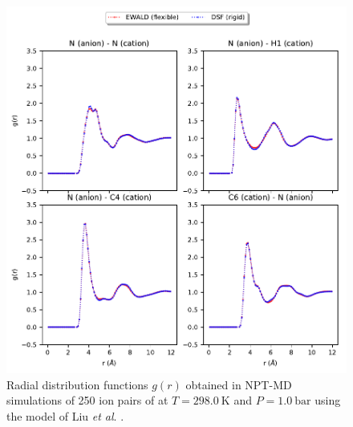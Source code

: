\documentclass[3p,onecolumn]{elsarticle}
\begin{document}
\begin{figure}[ht]
\includegraphics[]{rdf-Liu}
\caption{Radial distribution functions $g(r)$ obtained in NPT-MD simulations of 250 ion pairs of \ce{[emim][B(CN)4]} at $T = 298.0~\mathrm{K}$ and $P = 1.0~\mathrm{bar}$ using the model of Liu \textit{et al}. \cite{Liu_2014}.}
\label{fig:rdf-Liu}
\end{figure}
\end{document}
